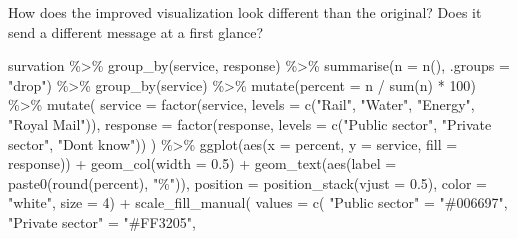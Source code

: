 \documentclass[
  letterpaper,
  DIV=11,
  numbers=noendperiod]{scrartcl}
\newenvironment{Shaded}{\begin{snugshade}}{\end{snugshade}}
\newcommand{\AttributeTok}[1]{\textcolor[rgb]{0.40,0.45,0.13}{#1}}
\newcommand{\DecValTok}[1]{\textcolor[rgb]{0.68,0.00,0.00}{#1}}
\newcommand{\FloatTok}[1]{\textcolor[rgb]{0.68,0.00,0.00}{#1}}
\newcommand{\FunctionTok}[1]{\textcolor[rgb]{0.28,0.35,0.67}{#1}}
\newcommand{\NormalTok}[1]{\textcolor[rgb]{0.00,0.23,0.31}{#1}}
\newcommand{\OtherTok}[1]{\textcolor[rgb]{0.00,0.23,0.31}{#1}}
\newcommand{\SpecialCharTok}[1]{\textcolor[rgb]{0.37,0.37,0.37}{#1}}
\newcommand{\StringTok}[1]{\textcolor[rgb]{0.13,0.47,0.30}{#1}}
\begin{document}
How does the improved visualization look different than the original?
Does it send a different message at a first glance?

\begin{Shaded}
\begin{Highlighting}[]
\NormalTok{survation }\SpecialCharTok{\%\textgreater{}\%}
  \FunctionTok{group\_by}\NormalTok{(service, response) }\SpecialCharTok{\%\textgreater{}\%}
  \FunctionTok{summarise}\NormalTok{(}\AttributeTok{n =} \FunctionTok{n}\NormalTok{(), }\AttributeTok{.groups =} \StringTok{"drop"}\NormalTok{) }\SpecialCharTok{\%\textgreater{}\%}
  \FunctionTok{group\_by}\NormalTok{(service) }\SpecialCharTok{\%\textgreater{}\%}
  \FunctionTok{mutate}\NormalTok{(}\AttributeTok{percent =}\NormalTok{ n }\SpecialCharTok{/} \FunctionTok{sum}\NormalTok{(n) }\SpecialCharTok{*} \DecValTok{100}\NormalTok{) }\SpecialCharTok{\%\textgreater{}\%}
  \FunctionTok{mutate}\NormalTok{(}
    \AttributeTok{service =} \FunctionTok{factor}\NormalTok{(service, }\AttributeTok{levels =} \FunctionTok{c}\NormalTok{(}\StringTok{"Rail"}\NormalTok{, }\StringTok{"Water"}\NormalTok{, }\StringTok{"Energy"}\NormalTok{, }\StringTok{"Royal Mail"}\NormalTok{)),}
    \AttributeTok{response =} \FunctionTok{factor}\NormalTok{(response,}
                      \AttributeTok{levels =} \FunctionTok{c}\NormalTok{(}\StringTok{"Public sector"}\NormalTok{, }\StringTok{"Private sector"}\NormalTok{, }\StringTok{"Don\textquotesingle{}t know"}\NormalTok{))}
\NormalTok{  ) }\SpecialCharTok{\%\textgreater{}\%}
  \FunctionTok{ggplot}\NormalTok{(}\FunctionTok{aes}\NormalTok{(}\AttributeTok{x =}\NormalTok{ percent, }\AttributeTok{y =}\NormalTok{ service, }\AttributeTok{fill =}\NormalTok{ response)) }\SpecialCharTok{+}
  \FunctionTok{geom\_col}\NormalTok{(}\AttributeTok{width =} \FloatTok{0.5}\NormalTok{) }\SpecialCharTok{+}
  \FunctionTok{geom\_text}\NormalTok{(}\FunctionTok{aes}\NormalTok{(}\AttributeTok{label =} \FunctionTok{paste0}\NormalTok{(}\FunctionTok{round}\NormalTok{(percent), }\StringTok{"\%"}\NormalTok{)),}
            \AttributeTok{position =} \FunctionTok{position\_stack}\NormalTok{(}\AttributeTok{vjust =} \FloatTok{0.5}\NormalTok{),}
            \AttributeTok{color =} \StringTok{"white"}\NormalTok{,}
            \AttributeTok{size =} \DecValTok{4}\NormalTok{) }\SpecialCharTok{+}
  \FunctionTok{scale\_fill\_manual}\NormalTok{(}
    \AttributeTok{values =} \FunctionTok{c}\NormalTok{(}
      \StringTok{"Public sector"} \OtherTok{=} \StringTok{"\#006697"}\NormalTok{,}
      \StringTok{"Private sector"} \OtherTok{=} \StringTok{"\#FF3205"}\NormalTok{,}

\end{Highlighting}
\end{Shaded}
\end{document}
